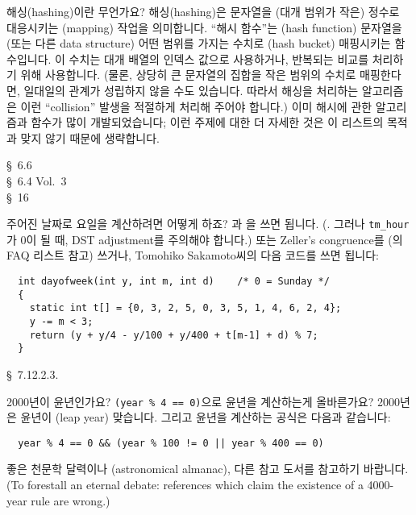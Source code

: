 \begin{faq}
	해싱(hashing)이란 무언가요?
\A
	해싱(hashing)은 문자열을 (대개 범위가 작은) 정수로 대응시키는
	(mapping) 작업을 의미합니다.  ``해시 함수''는 (hash function)
	문자열을 (또는 다른 data structure) 어떤 범위를 가지는
	수치로 (hash bucket) 매핑시키는 함수입니다.  이 수치는 대개
	배열의 인덱스 값으로 사용하거나, 반복되는 비교를 처리하기 위해
	사용합니다.  (물론, 상당히 큰 문자열의 집합을 작은 범위의
	수치로 매핑한다면, 일대일의 관계가 성립하지 않을 수도 있습니다.
	따라서 해싱을 처리하는 알고리즘은 이런 ``collision'' 발생을
	적절하게 처리해 주어야 합니다.)
	이미 해시에 관한 알고리즘과 함수가 많이 개발되었습니다;
	이런 주제에 대한 더 자세한 것은 이 리스트의 목적과 맞지 않기
	때문에 생략합니다.

\R	\cite{kr2} \S\ 6.6 \\
	\cite{knuth} \S\ 6.4  Vol.\ 3 \\
	\cite{calgo} \S\ 16 
\end{faq}

\begin{faq}
	주어진 날짜로 요일을 계산하려면 어떻게 하죠?
\A
	과 을 쓰면 됩니다.
        (.
	그러나 \verb+tm_hour+가 0이 될 때, DST adjustment를
	주의해야 합니다.) 또는 Zeller's congruence를 (의
	FAQ 리스트 참고) 쓰거나, Tomohiko Sakamoto씨의 다음 코드를
	쓰면 됩니다:

\begin{verbatim}
  int dayofweek(int y, int m, int d)    /* 0 = Sunday */
  {
    static int t[] = {0, 3, 2, 5, 0, 3, 5, 1, 4, 6, 2, 4};
    y -= m < 3;
    return (y + y/4 - y/100 + y/400 + t[m-1] + d) % 7;
  }
\end{verbatim}

\R
	\cite{c89} \S\ 7.12.2.3.
\end{faq}

\begin{faq}
	2000년이 윤년인가요? \verb+(year % 4 == 0)+으로 윤년을 계산하는게
	올바른가요?
\A
	2000년은 윤년이 (leap year) 맞습니다.  그리고 윤년을 계산하는 공식은
	다음과 같습니다:
\begin{verbatim}
  year % 4 == 0 && (year % 100 != 0 || year % 400 == 0)
\end{verbatim}
	좋은 천문학 달력이나 (astronomical almanac), 다른 참고 도서를
	참고하기 바랍니다.
	(To forestall an eternal debate: references which claim the
	existence of a 4000-year rule are wrong.)
\end{faq}

